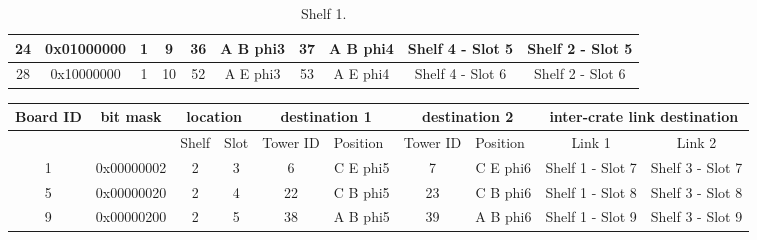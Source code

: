 \documentclass[11pt,letterpaper]{article}
\begin{document}
\begin{table}[h]
\begin{tabular}{|c|c|c|c|c|c|c|c|c|c|}
24                     & 0x01000000            & 1                          & 9                         & 36                            & A B phi3                      & 37                            & A B phi4                      & Shelf 4 - Slot 5        & Shelf 2 - Slot 5        \\ \hline
28                     & 0x10000000            & 1                          & 10                        & 52                            & A E phi3                      & 53                            & A E phi4                      & Shelf 4 - Slot 6        & Shelf 2 - Slot 6        \\ \hline
\end{tabular}
\caption{Shelf 1.}
\label{tab:shelf1}
\end{table}

\begin{table}[h]
\tiny
\begin{tabular}{|c|c|c|c|c|c|c|c|c|c|}
\hline
Board ID               & bit mask              & \multicolumn{2}{c|}{location}                          & \multicolumn{2}{c|}{destination 1}                            & \multicolumn{2}{c|}{destination 2}                            & \multicolumn{2}{c|}{inter-crate link destination} \\ \hline
\multicolumn{1}{|l|}{} & \multicolumn{1}{l|}{} & \multicolumn{1}{l|}{Shelf} & \multicolumn{1}{l|}{Slot} & \multicolumn{1}{l|}{Tower ID} & \multicolumn{1}{l|}{Position} & \multicolumn{1}{l|}{Tower ID} & \multicolumn{1}{l|}{Position} & Link 1                  & Link 2                  \\ \hline
1                      & 0x00000002            & 2                          & 3                         & 6                             & C E phi5                      & 7                             & C E phi6                      & Shelf 1 - Slot 7        & Shelf 3 - Slot 7        \\ \hline
5                      & 0x00000020            & 2                          & 4                         & 22                            & C B phi5                      & 23                            & C B phi6                      & Shelf 1 - Slot 8        & Shelf 3 - Slot 8        \\ \hline
9                      & 0x00000200            & 2                          & 5                         & 38                            & A B phi5                      & 39                            & A B phi6                      & Shelf 1 - Slot 9        & Shelf 3 - Slot 9        \\ \hline

\end{tabular}
\end{table}
\end{document}
